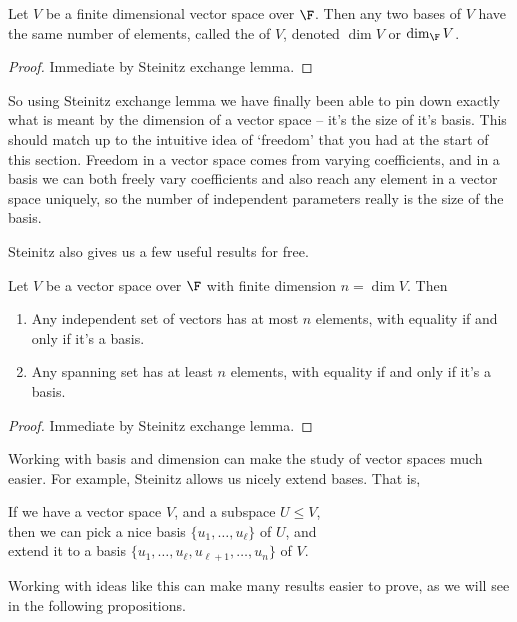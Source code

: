 \begin{corollary}[Dimension]
    Let $V$ be a finite dimensional vector space over $\F$. Then any two bases of $V$ have the same number of elements, called the  of $V$, denoted $\dim V$ or $\dim_\F V$.
\end{corollary}
\begin{proof}
    Immediate by Steinitz exchange lemma.
\end{proof}

So using Steinitz exchange lemma we have finally been able to pin down exactly what is meant by the dimension of a vector space -- it's the size of it's basis.
This should match up to the intuitive idea of `freedom' that you had at the start of this section. Freedom in a vector space comes from varying coefficients, and in a basis we can both freely vary coefficients and also reach any element in a vector space uniquely, so the number of independent parameters really is the size of the basis.

Steinitz also gives us a few useful results for free.

\begin{corollary}
    Let $V$ be a vector space over $\F$ with finite dimension $n = \dim V$. Then
    \begin{enumerate}[label=(\roman*)]
        \item Any independent set of vectors has at most $n$ elements, with equality if and only if it's a basis.
        \item Any spanning set has at least $n$ elements, with equality if and only if it's a basis.
    \end{enumerate} 
\end{corollary}
\begin{proof}
    Immediate by Steinitz exchange lemma.
\end{proof}

Working with basis and dimension can make the study of vector spaces much easier. For example, Steinitz allows us nicely extend bases. That is,
\begin{center}
	\color{blue}
    If we have a vector space $V$, and a subspace $U \leq V$, \\then we can pick a nice basis $\{u_1, \dots, u_\ell\}$ of $U$, and \\extend it to a basis $\{u_1, \dots, u_{\ell}, u_{\ell + 1}, \dots, u_n\}$ of $V$.
\end{center}Working with ideas like this can make many results easier to prove, as we will see in the following propositions.


